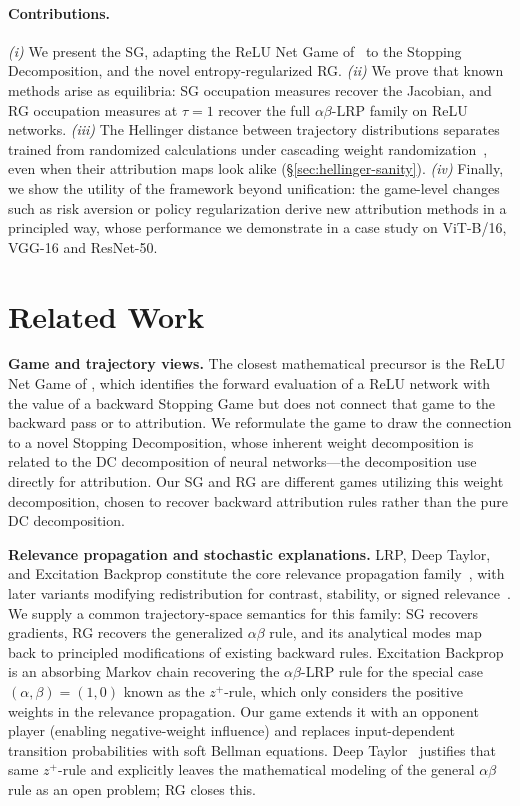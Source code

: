 \documentclass[twoside]{article}
\newif\ifch \chfalse
\newcommand{\ch}[1]{\ifch\textcolor{magenta}{#1}\else#1\fi}
\newcommand{\1}{\mathbf{1}}
\begin{document}
\paragraph{Contributions.}
\ch{\emph{(i)} We present the \acf{SG}, adapting the ReLU Net Game of~\citet{Gaubert2025} to the
Stopping Decomposition, and the novel entropy-regularized \acf{RG}.
\emph{(ii)} We prove that known methods arise as equilibria: \ac{SG} occupation measures recover
the Jacobian, and \ac{RG} occupation measures at $\tau{=}1$ recover the full $\alpha\beta$-\ac{LRP}
family on ReLU networks.
\emph{(iii)} The Hellinger distance between trajectory distributions separates trained from
randomized calculations under cascading weight randomization~\citep{Adebayo2018sanity}, even when
their attribution maps look alike
(\S\ref{sec:hellinger-sanity}).
\emph{(iv)} Finally, we show the utility of the framework beyond unification: the game-level
changes such as
risk aversion or policy regularization derive new attribution methods in a principled way, whose performance we demonstrate in a case study on ViT-B/16, VGG-16 and ResNet-50.}
\section{Related Work}\label{sec:related-work}

\textbf{Game and trajectory views.} The closest mathematical precursor is the ReLU Net Game of
\citet{Gaubert2025}, which identifies the forward evaluation of a ReLU network with the value of a
backward Stopping Game but does not connect that game to the backward pass or to attribution. We
reformulate the game to draw the connection to a novel Stopping Decomposition, whose inherent
weight decomposition is related to the \ac{DC} decomposition of neural networks---the decomposition
\citet{hiddenMono} use directly for attribution. Our \ac{SG} and \ac{RG} are different games
utilizing this weight decomposition, chosen to recover backward attribution rules rather than the
pure DC decomposition.

\textbf{Relevance propagation and stochastic explanations.} \ac{LRP}, Deep Taylor, and Excitation
Backprop constitute the core relevance propagation family~\citep{Bach2015, Montavon2017,
Zhang2018excitation}, with later variants modifying redistribution for contrast, stability, or
signed relevance~\citep{Binder2016, Kohlbrenner2020, Gu2019, Nam2020, vukadin2024abslrp}. We supply
a common trajectory-space semantics for this family: \ac{SG} recovers gradients, \ac{RG} recovers
the generalized $\alpha\beta$ rule, and its analytical modes map back to principled modifications
of existing backward rules. Excitation Backprop~\citep{Zhang2018excitation} is an absorbing Markov
chain recovering the $\alpha\beta$-\ac{LRP} rule for the special case $(\alpha, \beta) = (1,0)$
known as the $z^+$-rule, which only considers the positive weights in the relevance propagation.
Our game extends it with an opponent player (enabling negative-weight influence) and replaces
input-dependent transition probabilities with soft Bellman equations.
Deep
Taylor~\citep{Montavon2017} justifies that same $z^+$-rule and explicitly leaves the mathematical
modeling of the general $\alpha\beta$ rule as an open problem; \ac{RG} closes this.
\end{document}
